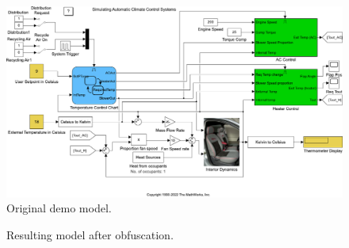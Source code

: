\documentclass{article}
\begin{document}
\begin{figure}[htb]
	\centering
	\includegraphics[width=.97\textwidth]{../figs/sldemo_before.pdf}
	\caption{Original demo model.}
	\label{fig:demo1}
\end{figure}

\begin{figure}[htb]
	\centering
	\caption{Resulting model after obfuscation.}
	\label{fig:demo2}
\end{figure}
\end{document}
